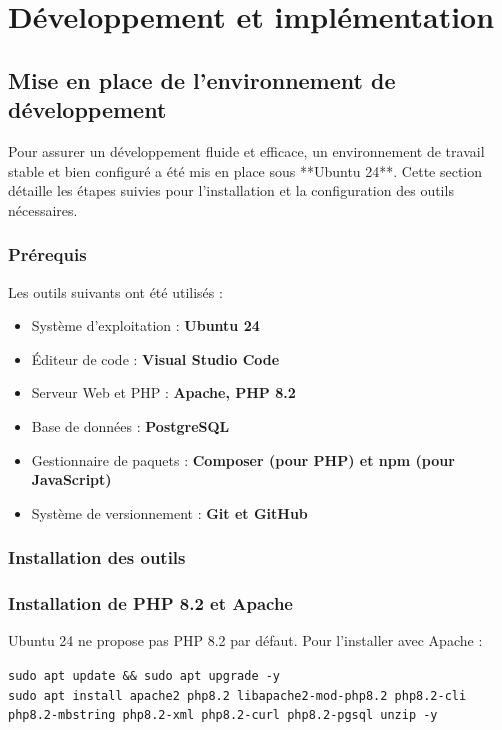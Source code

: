 \section{Développement et implémentation}

\subsection{Mise en place de l’environnement de développement}


Pour assurer un développement fluide et efficace, un environnement de travail stable et bien configuré a été mis en place sous **Ubuntu 24**. Cette section détaille les étapes suivies pour l’installation et la configuration des outils nécessaires.

\subsubsection{Prérequis}
Les outils suivants ont été utilisés :
\begin{itemize}
    \item Système d’exploitation : \textbf{Ubuntu 24}
    \item Éditeur de code : \textbf{Visual Studio Code}
    \item Serveur Web et PHP : \textbf{Apache, PHP 8.2}
    \item Base de données : \textbf{PostgreSQL}
    \item Gestionnaire de paquets : \textbf{Composer (pour PHP) et npm (pour JavaScript)}
    \item Système de versionnement : \textbf{Git et GitHub}
\end{itemize}

\subsubsection{Installation des outils}

\subsubsection*{Installation de PHP 8.2 et Apache}
Ubuntu 24 ne propose pas PHP 8.2 par défaut. Pour l’installer avec Apache :
\begin{tcolorbox}[colback=black, coltext=white, title=Installation de PHP 8.2 et Apache, fonttitle=\bfseries]
\texttt{sudo apt update \&\& sudo apt upgrade -y} \\
\texttt{sudo apt install apache2 php8.2 libapache2-mod-php8.2 php8.2-cli php8.2-mbstring php8.2-xml php8.2-curl php8.2-pgsql unzip -y}
\end{tcolorbox}

